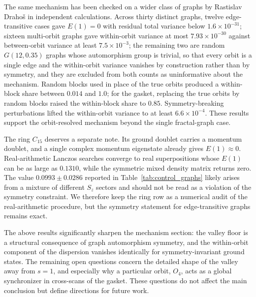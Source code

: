 \documentclass[pdflatex,sn-mathphys-num,iicol]{sn-jnl}
\begin{document}
The same mechanism has been checked on a wider class of graphs by Rastislav Draho\v{s} in independent calculations. Across thirty distinct graphs, twelve edge-transitive cases gave $E(1)=0$ with residual total variance below $1.6\times10^{-31}$; sixteen multi-orbit graphs gave within-orbit variance at most $7.93\times10^{-30}$ against between-orbit variance at least $7.5\times10^{-3}$; the remaining two are random $G(12,0.35)$ graphs whose automorphism group is trivial, so that every orbit is a single edge and the within-orbit variance vanishes by construction rather than by symmetry, and they are excluded from both counts as uninformative about the mechanism. Random blocks used in place of the true orbits produced a within-block share between $0.014$ and $1.0$; for the gasket, replacing the true orbits by random blocks raised the within-block share to $0.85$. Symmetry-breaking perturbations lifted the within-orbit variance to at least $6.6\times10^{-4}$. These results support the orbit-resolved mechanism beyond the single fractal-graph case.

The ring $C_{15}$ deserves a separate note. Its ground doublet carries a momentum doublet, and a single complex momentum eigenstate already gives $E(1)\approx0$. Real-arithmetic Lanczos searches converge to real superpositions whose $E(1)$ can be as large as $0.1310$, while the symmetric mixed density matrix returns zero. The value $0.0993\pm0.0286$ reported in Table~\ref{tab:control_graphs} likely arises from a mixture of different $S_z$ sectors and should not be read as a violation of the symmetry constraint. We therefore keep the ring row as a numerical audit of the real-arithmetic procedure, but the symmetry statement for edge-transitive graphs remains exact.

The above results significantly sharpen the mechanism section: the valley floor is a structural consequence of graph automorphism symmetry, and the within-orbit component of the dispersion vanishes identically for symmetry-invariant ground states. The remaining open questions concern the detailed shape of the valley away from $s=1$, and especially why a particular orbit, $O_4$, acts as a global synchronizer in cross-scans of the gasket. These questions do not affect the main conclusion but define directions for future work.
\end{document}
